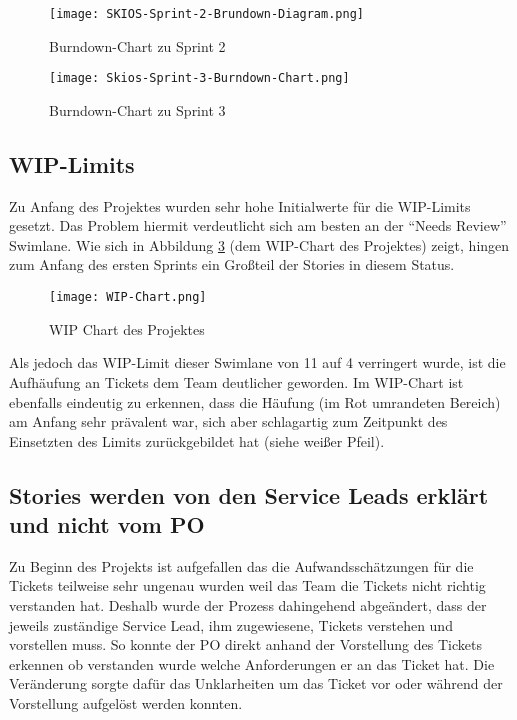 \begin{figure}[H]
    \texttt{[image: SKIOS-Sprint-2-Brundown-Diagram.png]}
    \caption{Burndown-Chart zu Sprint 2}
    \label{fig:SKIOS-Sprint-2-Burndown}
\end{figure}

\begin{figure}
    \texttt{[image: Skios-Sprint-3-Burndown-Chart.png]}
    \caption{Burndown-Chart zu Sprint 3}
    \label{fig:SKIOS-Sprint-3-Burndown}
\end{figure}

\subsection{WIP-Limits}
Zu Anfang des Projektes wurden sehr hohe Initialwerte für die \ac{WIP}-Limits gesetzt.
Das Problem hiermit verdeutlicht sich am besten an der \enquote{Needs Review} Swimlane.
Wie sich in Abbildung \ref{fig:WIP} (dem \ac{WIP}-Chart des Projektes) zeigt, hingen zum Anfang des ersten Sprints ein Großteil der Stories in diesem Status.

\begin{figure}
    \centering
    \texttt{[image: WIP-Chart.png]}
    \caption{WIP Chart des Projektes}
    \label{fig:WIP}
\end{figure}

Als jedoch das \ac{WIP}-Limit dieser Swimlane von 11 auf 4 verringert wurde, ist die Aufhäufung an Tickets dem Team deutlicher geworden.
Im \ac{WIP}-Chart ist ebenfalls eindeutig zu erkennen, dass die Häufung (im Rot umrandeten Bereich) am Anfang sehr prävalent war, sich aber schlagartig zum Zeitpunkt des Einsetzten des Limits zurückgebildet hat (siehe weißer Pfeil).

\subsection{Stories werden von den Service Leads erklärt und nicht vom PO}
Zu Beginn des Projekts ist aufgefallen das die Aufwandsschätzungen für die Tickets 
teilweise sehr ungenau wurden weil das Team die Tickets nicht richtig verstanden hat. 
Deshalb wurde der Prozess dahingehend abgeändert, dass der jeweils zuständige Service 
Lead, ihm zugewiesene, Tickets verstehen und vorstellen muss. So konnte der PO direkt 
anhand der Vorstellung des Tickets erkennen ob verstanden wurde welche Anforderungen 
er an das Ticket hat. Die Veränderung sorgte dafür das Unklarheiten um das Ticket vor
oder während der Vorstellung aufgelöst werden konnten. 

